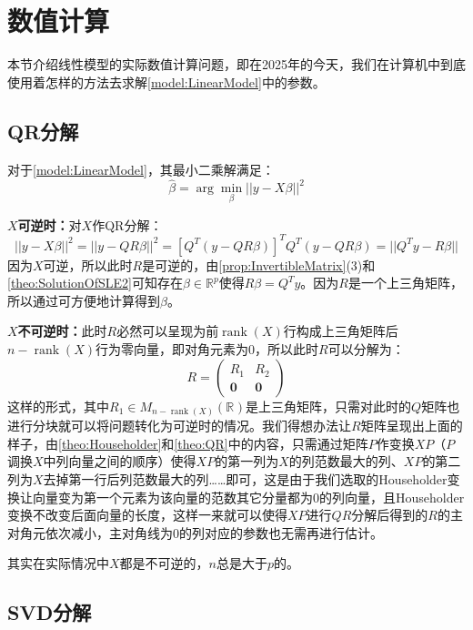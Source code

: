 \section{数值计算}

本节介绍线性模型的实际数值计算问题，即在2025年的今天，我们在计算机中到底使用着怎样的方法去求解\cref{model:LinearModel}中的参数。

\subsection{QR分解}
对于\cref{model:LinearModel}，其最小二乘解满足：
\begin{equation*}
	\hat{\beta}=\arg\min_{\beta}||y-X\beta||^2
\end{equation*}\par
\textbf{$X$可逆时：}对$X$作QR分解：
\begin{equation*}
	||y-X\beta||^2=||y-QR\beta||^2=[Q^T(y-QR\beta)]^TQ^T(y-QR\beta)=||Q^Ty-R\beta||
\end{equation*}
因为$X$可逆，所以此时$R$是可逆的，由\cref{prop:InvertibleMatrix}(3)和\cref{theo:SolutionOfSLE2}可知存在$\beta\in\mathbb{R}^{p}$使得$R\beta=Q^Ty$。因为$R$是一个上三角矩阵，所以通过可方便地计算得到$\beta$。\par
\textbf{$X$不可逆时：}此时$R$必然可以呈现为前$\operatorname{rank}(X)$行构成上三角矩阵后$n-\operatorname{rank}(X)$行为零向量，即对角元素为$0$，所以此时$R$可以分解为：
\begin{equation*}
	R=
	\begin{pmatrix}
		R_1 & R_2 \\
		\mathbf{0} & \mathbf{0}
	\end{pmatrix}
\end{equation*}
这样的形式，其中$R_1\in M_{n-\operatorname{rank}(X)}(\mathbb{R}^{})$是上三角矩阵，只需对此时的$Q$矩阵也进行分块就可以将问题转化为可逆时的情况。我们得想办法让$R$矩阵呈现出上面的样子，由\cref{theo:Householder}和\cref{theo:QR}中的内容，只需通过矩阵$P$作变换$XP$（$P$调换$X$中列向量之间的顺序）使得$XP$的第一列为$X$的列范数最大的列、$XP$的第二列为$X$去掉第一行后列范数最大的列……即可，这是由于我们选取的Householder变换让向量变为第一个元素为该向量的范数其它分量都为$0$的列向量，且Householder变换不改变后面向量的长度，这样一来就可以使得$XP$进行$QR$分解后得到的$R$的主对角元依次减小，主对角线为$0$的列对应的参数也无需再进行估计。\par
\begin{note}
	其实在实际情况中$X$都是不可逆的，$n$总是大于$p$的。
\end{note}

\subsection{SVD分解}